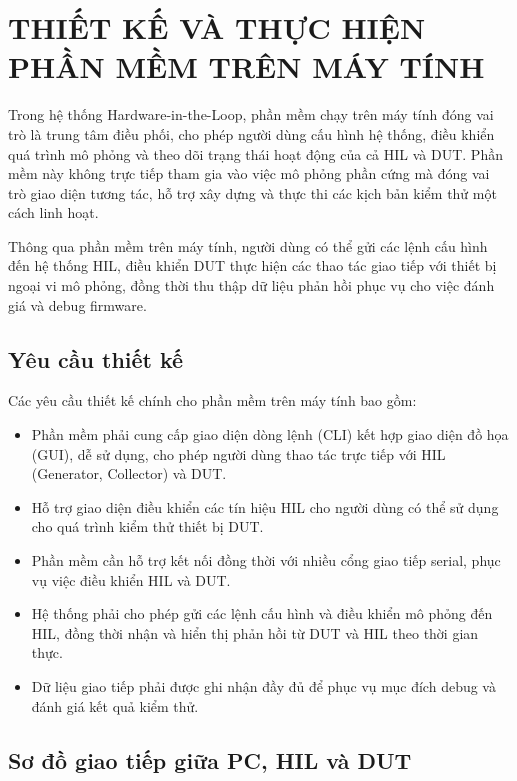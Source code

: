 \chapter{THIẾT KẾ VÀ THỰC HIỆN PHẦN MỀM TRÊN MÁY TÍNH}

Trong hệ thống Hardware-in-the-Loop, phần mềm chạy trên máy tính đóng vai trò là trung tâm điều phối, cho phép người dùng cấu hình hệ thống, điều khiển quá trình mô phỏng và theo dõi trạng thái hoạt động của cả HIL và DUT. Phần mềm này không trực tiếp tham gia vào việc mô phỏng phần cứng mà đóng vai trò giao diện tương tác, hỗ trợ xây dựng và thực thi các kịch bản kiểm thử một cách linh hoạt.

Thông qua phần mềm trên máy tính, người dùng có thể gửi các lệnh cấu hình đến hệ thống HIL, điều khiển DUT thực hiện các thao tác giao tiếp với thiết bị ngoại vi mô phỏng, đồng thời thu thập dữ liệu phản hồi phục vụ cho việc đánh giá và debug firmware.

\section{Yêu cầu thiết kế}

Các yêu cầu thiết kế chính cho phần mềm trên máy tính bao gồm:

\begin{itemize}
    \item Phần mềm phải cung cấp giao diện dòng lệnh (CLI) kết hợp giao diện đồ họa (GUI), dễ sử dụng, cho phép người dùng thao tác trực tiếp với HIL (Generator, Collector) và DUT.
    \item Hỗ trợ giao diện điều khiển các tín hiệu HIL cho người dùng có thể sử dụng cho quá trình kiểm thử thiết bị DUT.
    \item Phần mềm cần hỗ trợ kết nối đồng thời với nhiều cổng giao tiếp serial, phục vụ việc điều khiển HIL và DUT.
    \item Hệ thống phải cho phép gửi các lệnh cấu hình và điều khiển mô phỏng đến HIL, đồng thời nhận và hiển thị phản hồi từ DUT và HIL theo thời gian thực.
    \item Dữ liệu giao tiếp phải được ghi nhận đầy đủ để phục vụ mục đích debug và đánh giá kết quả kiểm thử.
\end{itemize}

\section{Sơ đồ giao tiếp giữa PC, HIL và DUT}

